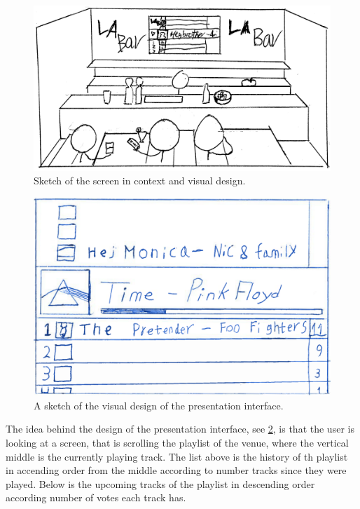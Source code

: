 \begin{figure}[hbtp]
  \centering
  \includegraphics[width=1.0\linewidth]{Images/presentation.png}
  \caption{Sketch of the screen in context and visual design.}\label{fig:PresentationInterface}
\end{figure}

\begin{figure}[hbtp]
  \centering
  \includegraphics[width=1.0\linewidth]{Images/presentationInterface.png}
  \caption{A sketch of the visual design of the presentation interface.}\label{fig:presentation}
\end{figure}

The idea behind the design of the presentation interface, see \cref{fig:presentation}, is that the user is looking at a screen, that is scrolling the playlist of the venue, where the vertical middle is the currently playing track. The list above is the history of th playlist in accending order from the middle according to number tracks since they were played. Below is the upcoming tracks of the playlist in descending order according number of votes each track has.
